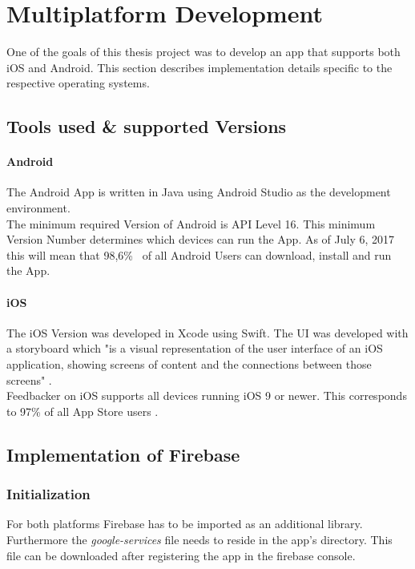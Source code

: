 \section{Multiplatform Development}
One of the goals of this thesis project was to develop an app that supports both iOS and Android. This section describes implementation details specific to the respective operating systems.
\subsection{Tools used \& supported Versions}
\paragraph{Android}
The Android App is written in Java using Android Studio as the development environment.\\
The minimum required Version of Android is API Level 16. This minimum Version Number determines which devices can run the App. As of July 6, 2017 this will mean that 98,6\%~\cite{versions_Android} of all Android Users can download, install and run the App.
\paragraph{iOS}
The iOS Version was developed in Xcode using Swift. The UI was developed with a storyboard which "is a visual representation of the user interface of an iOS application, showing screens of content and the connections between those screens" \cite{story}.\\
Feedbacker on iOS supports all devices running iOS 9 or newer. This corresponds to 97\% of all App Store users \cite{versions_iOS}.

\subsection{Implementation of Firebase}\label{ssec:implementation}

\subsubsection{Initialization}
For both platforms Firebase has to be imported as an additional library. Furthermore the \textit{google-services} file needs to reside in the app's directory. This file can be downloaded after registering the app in the firebase console.\\


